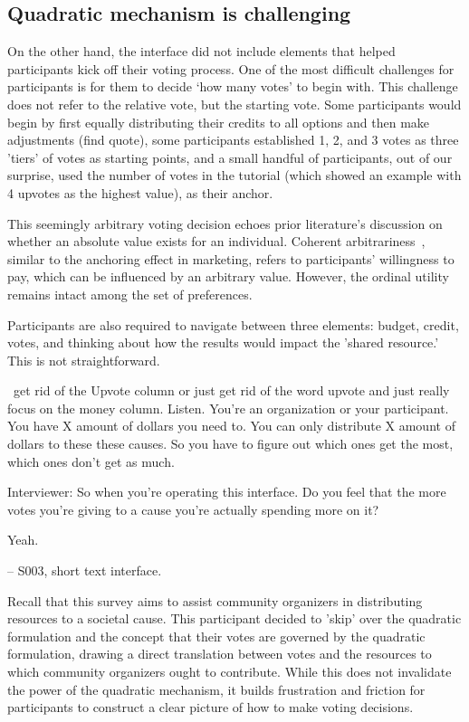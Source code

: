 \subsection{Quadratic mechanism is challenging}
On the other hand, the interface did not include elements that helped participants kick off their voting process. One of the most difficult challenges for participants is for them to decide `how many votes' to begin with. This challenge does not refer to the relative vote, but the starting vote. Some participants would begin by first equally distributing their credits to all options and then make adjustments (find quote), some participants established 1, 2, and 3 votes as three 'tiers' of votes as starting points, and a small handful of participants, out of our surprise, used the number of votes in the tutorial (which showed an example with 4 upvotes as the highest value), as their anchor. 

This seemingly arbitrary voting decision echoes prior literature's discussion on whether an absolute value exists for an individual. Coherent arbitrariness~\cite{arielyCoherentArbitrarinessStable2003}, similar to the anchoring effect in marketing, refers to participants' willingness to pay, which can be influenced by an arbitrary value. However, the ordinal utility remains intact among the set of preferences. 

Participants are also required to navigate between three elements: budget, credit, votes, and thinking about how the results would impact the 'shared resource.' This is not straightforward. 

\begin{displayquote}

~\bracketellipsis get rid of the Upvote column or just get rid of the word upvote and just really focus on the money column. Listen. You're an organization or your participant. You have X amount of dollars you need to. You can only distribute X amount of dollars to these these causes. So you have to figure out which ones get the most, which ones don't get as much.~\bracketellipsis 

Interviewer: So when you're operating this interface. Do you feel that the more votes you're giving to a cause you're actually spending more on it?

Yeah.
       
\noindent \hfill -- S003, short text interface.
\end{displayquote}
Recall that this survey aims to assist community organizers in distributing resources to a societal cause. This participant decided to 'skip' over the quadratic formulation and the concept that their votes are governed by the quadratic formulation, drawing a direct translation between votes and the resources to which community organizers ought to contribute. While this does not invalidate the power of the quadratic mechanism, it builds frustration and friction for participants to construct a clear picture of how to make voting decisions. 

